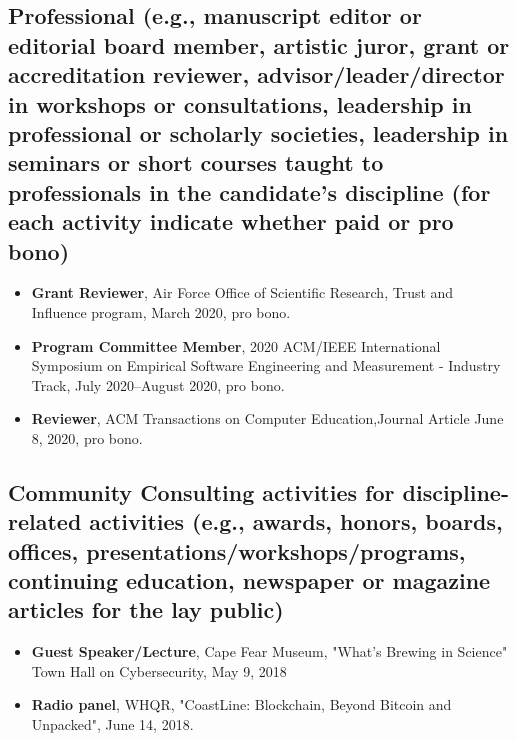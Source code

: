 \documentclass[10pt]{article}
\begin{document}
\subsection{Professional (e.g., manuscript editor or editorial board member, artistic juror, grant or accreditation reviewer, advisor/leader/director in workshops or consultations, leadership in professional or scholarly societies, leadership in seminars or short courses taught to professionals in the candidate's discipline (for each activity indicate whether paid or pro bono)}
\begin{itemize}
	\item \textbf{Grant Reviewer}, Air Force Office of Scientific Research, Trust and Influence program, March 2020, pro bono.
    \item \textbf{Program Committee Member}, 2020 ACM/IEEE International Symposium on Empirical Software Engineering and Measurement - Industry Track, July 2020--August 2020, pro bono.
    \item \textbf{Reviewer}, ACM Transactions on Computer Education,Journal Article June 8, 2020, pro bono.
\end{itemize}

\subsection{Community Consulting activities for discipline-related activities (e.g., awards, honors, boards, offices, presentations/workshops/programs, continuing education, newspaper or magazine articles for the lay public)}
\begin{itemize}
    \item \textbf{Guest Speaker/Lecture}, Cape Fear Museum, "What's Brewing in Science" Town Hall on Cybersecurity, May 9, 2018
    \item \textbf{Radio panel}, WHQR, "CoastLine: Blockchain, Beyond Bitcoin and Unpacked", June 14, 2018.
\end{itemize}

\newpage




\end{document}
